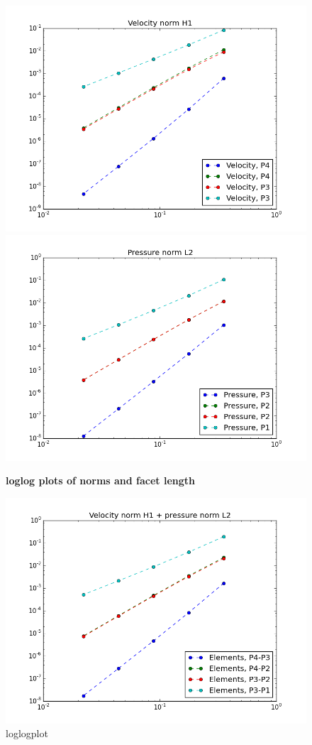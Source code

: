 \documentclass[a4paper,norsk]{article}
\begin{document}
\begin{figure}[h!]
        \centering
        \caption*{\textbf{loglog plots of norms and facet length}}
        \includegraphics[scale=0.36]{velocity.png}
                \includegraphics[scale=0.36]{pressure.png}
\end{figure}
\begin{figure}[h!]
        \centering
        \caption*{loglogplot}
        \includegraphics[scale=0.5]{comb.png}
\end{figure}
\newpage
\end{document}
